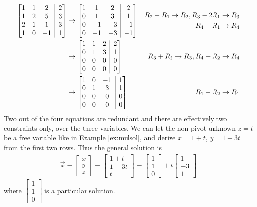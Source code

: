 \begin{solution}
\begin{align*}
\left[\begin{array}{@{}ccc|c@{}}
1 & 1 & 2 & 2 \\
1 & 2 & 5 & 3 \\
2 & 1 & 1 & 3 \\
1 & 0 & -1 & 1
\end{array}\right] 
& \to 
\left[\begin{array}{@{}ccc|c@{}}
1 & 1 & 2 & 2 \\
0 & 1 & 3 & 1 \\
0 & -1 & -3 & -1\\
0 & -1 & -3 & -1
\end{array}\right] 
& \begin{aligned}
R_2 - R_1 \to R_2, R_3 - 2R_1 \to R_3 \\
R_4 - R_1 \to R_4
\end{aligned}\\ 
& \to 
\left[\begin{array}{@{}ccc|c@{}}
1 & 1 & 2 & 2 \\
0 & 1 & 3 & 1 \\
0 & 0 & 0 & 0 \\
0 & 0 & 0 & 0
\end{array}\right] 
& R_3 + R_2 \to R_3, R_4 + R_2 \to R_4 \\
& \to 
\left[\begin{array}{@{}ccc|c@{}}
1 & 0 & -1 & 1 \\
0 & 1 & 3 & 1 \\
0 & 0 & 0 & 0 \\
0 & 0 & 0 & 0
\end{array}\right] 
& R_1- R_2 \to R_1 
\end{align*}
Two out of the four equations are redundant and there are effectively two constraints only, over the three variables. We can let the non-pivot unknown $z = t$ be a free variable like in Example \ref{ex:mulsol}, and derive $x = 1+t$, $y = 1-3t$ from the first two rows. Thus the general solution is
\begin{align*}
\vec{x} = 
\begin{bmatrix}
x \\
y \\
z
\end{bmatrix}
=
\begin{bmatrix}
1+t \\
1-3t \\
t
\end{bmatrix}
=
\begin{bmatrix}
1 \\
1 \\
0
\end{bmatrix}
+ t
\begin{bmatrix}
1 \\
-3 \\
1
\end{bmatrix}
\end{align*}
where $\begin{bmatrix}
1 \\
1 \\
0    
\end{bmatrix}$
is a particular solution.
\end{solution}

